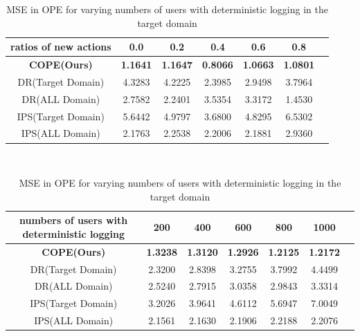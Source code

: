 \begin{table}[h]
\begin{minipage}{\textwidth}
    \centering
    \caption{MSE in OPE for varying ratios of new actions in the target domain} \vspace{1mm}
    \begin{tabular}{c|cccccc}
        \toprule
        ratios of new actions & 0.0   & 0.2    & 0.4    & 0.6    & 0.8  \\
        \midrule\midrule
        \textbf{COPE(Ours)}       & \textbf{1.1641} & \textbf{1.1647} & \textbf{0.8066} & \textbf{1.0663} & \textbf{1.0801} \\
        DR(Target Domain)        & 4.3283 & 4.2225 & 2.3985 & 2.9498 & 3.7964 \\
        DR(ALL Domain)    & 2.7582 & 2.2401 & 3.5354 & 3.3172 & 1.4530 \\
        IPS(Target Domain)       & 5.6442 & 4.9797 & 3.6800 & 4.8295 & 6.5302 \\
        IPS(ALL Domain)   & 2.1763 & 2.2538 & 2.2006 & 2.1881 & 2.9360 \\
        \hline
    \end{tabular}
    \label{table:ope-new-actions}
    \vspace{-2pt}
\end{minipage} \\
\begin{minipage}{\textwidth}
    \centering
    \caption{MSE in OPE for varying numbers of users with deterministic logging in the target domain} \vspace{1mm}
   \begin{tabular}{c|cccccc}
        \toprule
        numbers of users with deterministic logging    & 200    & 400    & 600    & 800    & 1000 \\
        \midrule\midrule
        \textbf{COPE(Ours)}      & \textbf{1.3238} & \textbf{1.3120} & \textbf{1.2926} & \textbf{1.2125} & \textbf{1.2172} \\
         DR(Target Domain)        & 2.3200 & 2.8398 & 3.2755 & 3.7992 & 4.4499 \\
        DR(ALL Domain)    & 2.5240 & 2.7915 & 3.0358 & 2.9843 & 3.3314 \\
        IPS(Target Domain)       & 3.2026 & 3.9641 & 4.6112 & 5.6947 & 7.0049 \\
        IPS(ALL Domain)   & 2.1561 & 2.1630 & 2.1906 & 2.2188 & 2.2076 \\
        \bottomrule
    \end{tabular}

\end{minipage}
\end{table}
